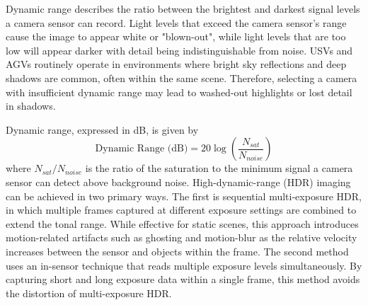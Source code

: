 \documentclass{erauthesis}
\begin{document}



Dynamic range describes the ratio between the brightest and darkest signal levels a camera sensor can record.
Light levels that exceed the camera sensor's range cause the image to appear white or "blown-out", while light levels that are too low will appear darker with detail being indistinguishable from noise.
\acp{USV} and \acp{AGV} routinely operate in environments where bright sky reflections and deep shadows are common, often within the same scene.
Therefore, selecting a camera with insufficient dynamic range may lead to washed-out highlights or lost detail in shadows.

Dynamic range, expressed in dB, is given by
\begin{equation}
 \text{Dynamic Range (dB)} = 20 \log{\left( \frac{N_{sat}}{N_{noise}}\right) }
\end{equation}
where $N_{sat}/N_{noise}$ is the ratio of the saturation to the minimum signal a camera sensor can detect above background noise.
High-dynamic-range (HDR) imaging can be achieved in two primary ways. 
The first is sequential multi-exposure \ac{HDR}, in which multiple frames captured at different exposure settings are combined to extend the tonal range. 
While effective for static scenes, this approach introduces motion-related artifacts such as ghosting and motion-blur as the relative velocity increases between the sensor and objects within the frame.
The second method uses an in-sensor technique that reads multiple exposure levels simultaneously. 
By capturing short and long exposure data within a single frame, this method avoids the distortion of multi-exposure \ac{HDR}.
\end{document}
